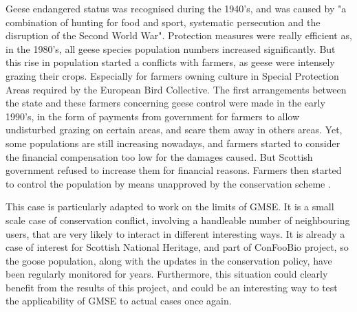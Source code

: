 \documentclass[12pt,a4paper]{article}
\begin{document}
Geese endangered status was recognised during the 1940's, and was caused by "a combination of hunting for food and sport, systematic persecution and the disruption of the Second World War".
Protection measures were really efficient as, in the 1980's, all geese species population numbers increased significantly.
But this rise in population started a conflicts with farmers, as geese were intensely grazing their crops.
Especially for farmers owning culture in Special Protection Areas required by the European Bird Collective.
The first arrangements between the state and these farmers concerning geese control were made in the early 1990's, in the form of payments from government for farmers to allow undisturbed grazing on certain areas, and scare them away in others areas.
Yet, some populations are still increasing nowadays, and farmers started to consider the financial compensation too low for the damages caused.
But Scottish government refused to increase them for financial reasons.
Farmers then started to control the population by means unapproved by the conservation scheme \citep{bainbridge2017goose}.

This case is particularly adapted to work on the limits of GMSE.
It is a small scale case of conservation conflict, involving a handleable number of neighbouring users, that are very likely to interact in different interesting ways.
It is already a case of interest for Scottish National Heritage, and part of ConFooBio project, so the goose population, along with the updates in the conservation policy, have been regularly monitored for years.
Furthermore, this situation could clearly benefit from the results of this project, and could be an interesting way to test the applicability of GMSE to actual cases once again.
\end{document}
